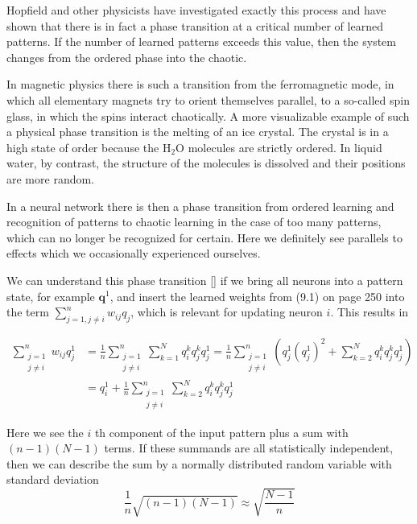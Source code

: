 \documentclass[10pt]{book}
\begin{document}
Hopfield and other physicists have investigated exactly this process and have shown that there is in fact a phase transition at a critical number of learned patterns. If the number of learned patterns exceeds this value, then the system changes from the ordered phase into the chaotic.

In magnetic physics there is such a transition from the ferromagnetic mode, in which all elementary magnets try to orient themselves parallel, to a so-called spin glass, in which the spins interact chaotically. A more visualizable example of such a physical phase transition is the melting of an ice crystal. The crystal is in a high state of order because the $\mathrm{H}_{2} \mathrm{O}$ molecules are strictly ordered. In liquid water, by contrast, the structure of the molecules is dissolved and their positions are more random.

In a neural network there is then a phase transition from ordered learning and recognition of patterns to chaotic learning in the case of too many patterns, which can no longer be recognized for certain. Here we definitely see parallels to effects which we occasionally experienced ourselves.

We can understand this phase transition [\cite{ritter1992neural}] if we bring all neurons into a pattern state, for example $\boldsymbol{q}^{1}$, and insert the learned weights from (9.1) on page 250 into the term $\sum_{j=1, j \neq i}^{n} w_{i j} q_{j}$, which is relevant for updating neuron $i$. This results in

$$
\begin{aligned}
\sum_{\substack{j=1 \\
j \neq i}}^{n} w_{i j} q_{j}^{1} & =\frac{1}{n} \sum_{\substack{j=1 \\
j \neq i}}^{n} \sum_{k=1}^{N} q_{i}^{k} q_{j}^{k} q_{j}^{1}=\frac{1}{n} \sum_{\substack{j=1 \\
j \neq i}}^{n}\left(q_{j}^{1}\left(q_{j}^{1}\right)^{2}+\sum_{k=2}^{N} q_{i}^{k} q_{j}^{k} q_{j}^{1}\right) \\
& =q_{i}^{1}+\frac{1}{n} \sum_{\substack{j=1 \\
j \neq i}}^{n} \sum_{k=2}^{N} q_{i}^{k} q_{j}^{k} q_{j}^{1}
\end{aligned}
$$

Here we see the $i$ th component of the input pattern plus a sum with $(n-1)(N-1)$ terms. If these summands are all statistically independent, then we can describe the sum by a normally distributed random variable with standard deviation
$$
\frac{1}{n} \sqrt{(n-1)(N-1)} \approx \sqrt{\frac{N-1}{n}}
$$
\end{document}
